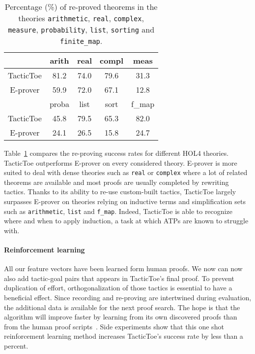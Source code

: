 \documentclass[runningheads,a4paper,draft]{svjour3}
\def\holfour{\textsf{HOL4}\xspace}
\def\eprover{\textsf{E-prover}\xspace}
\def\tactictoe{\textsf{TacticToe}\xspace}
\begin{document}
\begin{table}[]
\centering
\setlength{\tabcolsep}{3mm}
\begin{tabular}{@{}ccccc@{}}
\toprule
\phantom{ab} & {arith} & {real} & {compl} & {meas} \\
\midrule
\tactictoe & 81.2 & 74.0 & 79.6 & 31.3\\
\eprover & 59.9 & 72.0 & 67.1 & 12.8\\
\midrule
\phantom{abc} & {proba} & {list} & {sort} & {f\_map} \\
\midrule
\tactictoe & 45.8 & 79.5 & 65.3 & 82.0 \\
\eprover & 24.1 & 26.5 & 15.8 & 24.7 \\
\bottomrule
\end{tabular}
\caption{\label{theories}Percentage (\%) of re-proved theorems in the theories
\texttt{arithmetic}, \texttt{real}, \texttt{complex}, \texttt{measure},
\texttt{probability}, \texttt{list}, \texttt{sorting} and \texttt{finite\_map}.
}
\end{table}

Table~\ref{theories} compares the re-proving success rates for different
\holfour theories. \tactictoe outperforms \eprover on every
considered theory.
\eprover is more suited to deal with dense theories such as
\texttt{real} or \texttt{complex} where a lot of related theorems are available
and most proofs are usually completed by rewriting tactics. Thanks to its
ability to re-use custom-built tactics, \tactictoe
largely surpasses \eprover on theories relying on inductive terms and
simplification sets such as \texttt{arithmetic}, \texttt{list}
and \texttt{f\_map}. Indeed, \tactictoe is able to recognize where and when to
apply induction, a task at which ATPs are known to struggle with.

\paragraph{Reinforcement learning}
All our feature vectors have been learned form human proofs. We now can now
also add tactic-goal pairs that appears in \tactictoe's final proof. To prevent
duplication of effort, orthogonalization of those
tactics is essential to have a beneficial effect.
Since recording and re-proving are intertwined during evaluation, the
additional data is available for the next proof search.
The hope is that the algorithm will improve faster by learning from its own
discovered proofs than from the human proof
scripts~\cite{DBLP:conf/cade/Urban07}. Side experiments show that
this one shot reinforcement learning method increases \tactictoe's success rate
by less than a percent.
\end{document}
